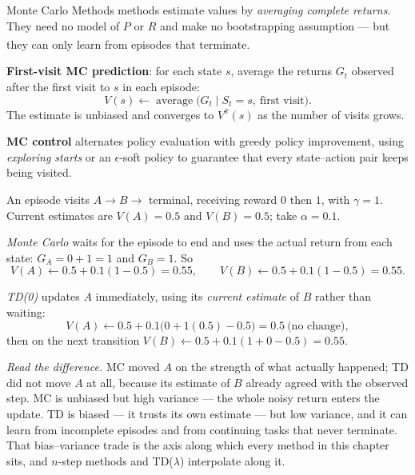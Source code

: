 \begin{v3topic}{Monte Carlo Methods}
         methods estimate values by \emph{averaging
        complete returns}. They need no model of $P$ or $R$ and make no
        bootstrapping assumption --- but they can only learn from episodes
        that terminate\textsuperscript{\cite[][ch.~5]{suttonReinforcementLearningIntroduction2018}}.

        \textbf{First-visit MC prediction}: for each state $s$, average the
        returns $G_t$ observed after the first visit to $s$ in each episode:
        \begin{equation}
            V(s) \leftarrow \operatorname{average}\bigl(G_t \mid
            S_t = s,\ \text{first visit}\bigr).
            \label{eq:rl-mc-prediction}
        \end{equation}
        The estimate is unbiased and converges to $V^{\pi}(s)$ as the number
        of visits grows.

        \textbf{MC control} alternates policy evaluation with greedy policy
        improvement, using \emph{exploring starts} or an $\epsilon$-soft
        policy to guarantee that every state--action pair keeps being visited.

\begin{workedexample}
An episode visits $A \to B \to$ terminal, receiving reward $0$ then $1$, with
$\gamma = 1$. Current estimates are $V(A) = 0.5$ and $V(B) = 0.5$; take
$\alpha = 0.1$.

\emph{Monte Carlo} waits for the episode to end and uses the actual return
from each state: $G_A = 0 + 1 = 1$ and $G_B = 1$. So
\[
  V(A) \leftarrow 0.5 + 0.1(1 - 0.5) = 0.55,
  \qquad
  V(B) \leftarrow 0.5 + 0.1(1 - 0.5) = 0.55 .
\]

\emph{TD(0)} updates $A$ immediately, using its \emph{current estimate} of
$B$ rather than waiting:
\[
  V(A) \leftarrow 0.5 + 0.1\bigl(0 + 1(0.5) - 0.5\bigr) = 0.5 \ \text{(no change)},
\]
then on the next transition
$V(B) \leftarrow 0.5 + 0.1(1 + 0 - 0.5) = 0.55$.

\emph{Read the difference.} MC moved $A$ on the strength of what actually
happened; TD did not move $A$ at all, because its estimate of $B$ already
agreed with the observed step. MC is unbiased but high variance --- the whole
noisy return enters the update. TD is biased --- it trusts its own estimate ---
but low variance, and it can learn from incomplete episodes and from
continuing tasks that never terminate. That bias--variance trade is the axis
along which every method in this chapter sits, and $n$-step methods and
TD($\lambda$) interpolate along it.
\end{workedexample}

\end{v3topic}
